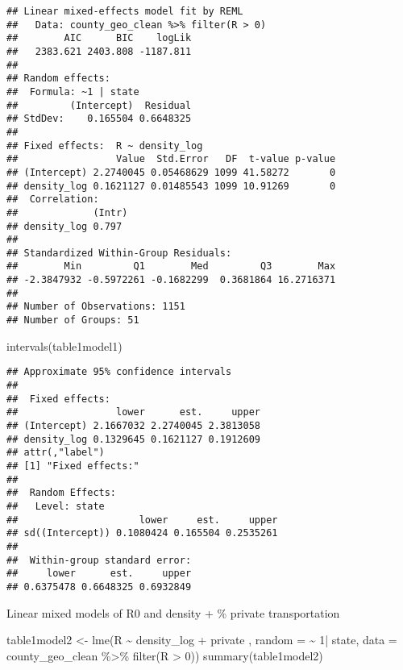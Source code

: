 \documentclass[10pt,letterpaper]{article}
\newenvironment{Shaded}{\begin{snugshade}}{\end{snugshade}}
\newcommand{\AttributeTok}[1]{\textcolor[rgb]{0.77,0.63,0.00}{#1}}
\newcommand{\DecValTok}[1]{\textcolor[rgb]{0.00,0.00,0.81}{#1}}
\newcommand{\FunctionTok}[1]{\textcolor[rgb]{0.00,0.00,0.00}{#1}}
\newcommand{\NormalTok}[1]{#1}
\newcommand{\OtherTok}[1]{\textcolor[rgb]{0.56,0.35,0.01}{#1}}
\newcommand{\SpecialCharTok}[1]{\textcolor[rgb]{0.00,0.00,0.00}{#1}}
\begin{document}
\begin{verbatim}
## Linear mixed-effects model fit by REML
##   Data: county_geo_clean %>% filter(R > 0) 
##        AIC      BIC    logLik
##   2383.621 2403.808 -1187.811
## 
## Random effects:
##  Formula: ~1 | state
##         (Intercept)  Residual
## StdDev:    0.165504 0.6648325
## 
## Fixed effects:  R ~ density_log 
##                 Value  Std.Error   DF  t-value p-value
## (Intercept) 2.2740045 0.05468629 1099 41.58272       0
## density_log 0.1621127 0.01485543 1099 10.91269       0
##  Correlation: 
##             (Intr)
## density_log 0.797 
## 
## Standardized Within-Group Residuals:
##        Min         Q1        Med         Q3        Max 
## -2.3847932 -0.5972261 -0.1682299  0.3681864 16.2716371 
## 
## Number of Observations: 1151
## Number of Groups: 51
\end{verbatim}

\begin{Shaded}
\begin{Highlighting}[]
\FunctionTok{intervals}\NormalTok{(table1model1)}
\end{Highlighting}
\end{Shaded}

\begin{verbatim}
## Approximate 95% confidence intervals
## 
##  Fixed effects:
##                 lower      est.     upper
## (Intercept) 2.1667032 2.2740045 2.3813058
## density_log 0.1329645 0.1621127 0.1912609
## attr(,"label")
## [1] "Fixed effects:"
## 
##  Random Effects:
##   Level: state 
##                     lower     est.     upper
## sd((Intercept)) 0.1080424 0.165504 0.2535261
## 
##  Within-group standard error:
##     lower      est.     upper 
## 0.6375478 0.6648325 0.6932849
\end{verbatim}

Linear mixed models of R0 and density + \% private transportation

\begin{Shaded}
\begin{Highlighting}[]
\NormalTok{table1model2 }\OtherTok{\textless{}{-}} \FunctionTok{lme}\NormalTok{(R }\SpecialCharTok{\textasciitilde{}}\NormalTok{ density\_log }\SpecialCharTok{+}\NormalTok{ private , }
                    \AttributeTok{random =} \SpecialCharTok{\textasciitilde{}} \DecValTok{1}\SpecialCharTok{|}\NormalTok{ state, }
                    \AttributeTok{data =}\NormalTok{ county\_geo\_clean }\SpecialCharTok{\%\textgreater{}\%}
                      \FunctionTok{filter}\NormalTok{(R }\SpecialCharTok{\textgreater{}} \DecValTok{0}\NormalTok{))}
\FunctionTok{summary}\NormalTok{(table1model2)}
\end{Highlighting}
\end{Shaded}
\end{document}
